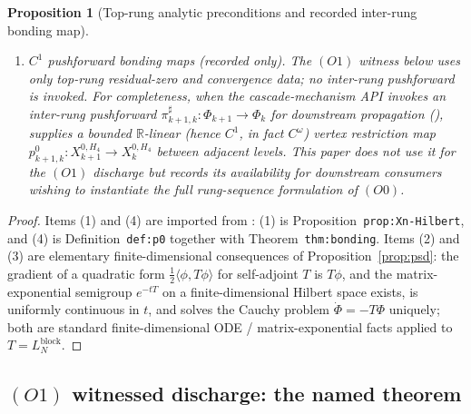 \documentclass[11pt]{article}
\newcommand{\R}{\mathbb{R}}
\newtheorem{proposition}[theorem]{Proposition}
\theoremstyle{definition}
\begin{document}
\begin{proposition}[Top-rung analytic preconditions and recorded
inter-rung bonding map]
\begin{enumerate}[label=\textup{(O0.\arabic*)}, leftmargin=3em]
\item \emph{$C^{1}$ pushforward bonding maps (recorded only).} The
  $(O1)$ witness below uses only top-rung residual-zero and
  convergence data; no inter-rung pushforward is invoked. For
  completeness, when the cascade-mechanism API invokes an
  inter-rung pushforward $\pi^{\sharp}_{k+1, k} \colon \Phi_{k+1}
  \to \Phi_k$ for downstream propagation
  (\cite[\S 3.4 lines 600--605]{CascadeMechanism}),
  \cite[Definition~\texttt{def:p0}, Theorem~\texttt{thm:bonding}]
  {RefinementSpaces} supplies a bounded $\R$-linear (hence $C^{1}$,
  in fact $C^{\omega}$) vertex restriction map
  $p_{k+1, k}^{0} \colon X_{k+1}^{0, H_4} \to X_k^{0, H_4}$
  between adjacent levels. This paper does not use it for the
  $(O1)$ discharge but records its availability for downstream
  consumers wishing to instantiate the full rung-sequence
  formulation of $(O0)$.
\end{enumerate}
\end{proposition}

\begin{proof}
Items (1) and (4) are imported from
\cite{RefinementSpaces}: (1) is
Proposition~\texttt{prop:Xn-Hilbert}, and (4) is
Definition~\texttt{def:p0} together with
Theorem~\texttt{thm:bonding}. Items (2) and (3) are elementary
finite-dimensional consequences of Proposition~\ref{prop:psd}:
the gradient of a quadratic form $\tfrac12 \langle \phi, T\phi
\rangle$ for self-adjoint $T$ is $T\phi$, and the
matrix-exponential semigroup $e^{-tT}$ on a finite-dimensional
Hilbert space exists, is uniformly continuous in $t$, and solves
the Cauchy problem $\dot\Phi = -T\Phi$ uniquely; both are
standard finite-dimensional ODE / matrix-exponential facts
applied to $T = L_N^{\mathrm{block}}$.
\end{proof}

\subsection{$(O1)$ witnessed discharge: the named theorem}
\end{document}
